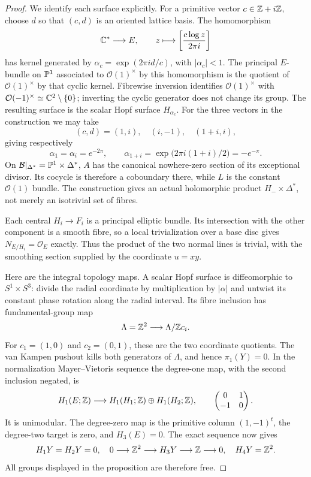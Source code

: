 \begin{proof}
We identify each surface explicitly.  For a primitive vector
$c\in\mathbb Z+i\mathbb Z$, choose $d$ so that $(c,d)$ is an oriented
lattice basis.  The homomorphism
\[
 \mathbb C^*\longrightarrow E,\qquad
 z\longmapsto\left[\frac{c\log z}{2\pi i}\right]
\]
has kernel generated by
$\alpha_c=\exp(2\pi i d/c)$, with $|\alpha_c|<1$.
The principal $E$-bundle on $\mathbb P^1$ associated to
$\mathcal O(1)^\times$ by this homomorphism is the quotient
of $\mathcal O(1)^\times$ by that cyclic kernel.  Fibrewise
inversion identifies $\mathcal O(1)^\times$ with
$\mathcal O(-1)^\times\simeq\mathbb C^2\setminus\{0\}$;
inverting the cyclic generator does not change its group.
The resulting surface is the scalar Hopf surface $H_{\alpha_c}$.
For the three vectors in the construction we may take
\[
 (c,d)=(1,i),\quad(i,-1),\quad(1+i,i),
\]
giving respectively
\[
 \alpha_1=\alpha_i=e^{-2\pi},\qquad
 \alpha_{1+i}=\exp\bigl(2\pi i(1+i)/2\bigr)=-e^{-\pi}.
\]
On $\mathcal B|_{\Delta^*}=\mathbb P^1\times\Delta^*$,
$A$ has the canonical nowhere-zero section of its exceptional
divisor.  Its cocycle is therefore a coboundary there, while
$L$ is the constant $\mathcal O(1)$ bundle.  The construction
gives an actual holomorphic product $H_-\times\Delta^*$,
not merely an isotrivial set of fibres.

Each central $H_i\to F_i$ is a principal elliptic bundle.
Its intersection with the other component is a smooth fibre,
so a local trivialization over a base disc gives
$N_{E/H_i}=\mathcal O_E$ exactly.  Thus the product of the
two normal lines is trivial, with the smoothing section supplied
by the coordinate $u=xy$.

Here are the integral topology maps.  A scalar Hopf surface is
diffeomorphic to $S^1\times S^3$: divide the radial coordinate
by multiplication by $|\alpha|$ and untwist its constant phase
rotation along the radial interval.  Its fibre inclusion has
fundamental-group map
\[
 \Lambda=\mathbb Z^2\longrightarrow\Lambda/\mathbb Z c_i.
\]
For $c_1=(1,0)$ and $c_2=(0,1)$, these are the two coordinate
quotients.  The van Kampen pushout kills both generators of
$\Lambda$, and hence $\pi_1(Y)=0$.  In the normalization
Mayer--Vietoris sequence the degree-one map, with the second
inclusion negated, is
\[
 H_1(E;\mathbb Z)\longrightarrow H_1(H_1;\mathbb Z)\oplus H_1(H_2;\mathbb Z),
 \qquad \begin{pmatrix}0&1\\-1&0\end{pmatrix}.
\]
It is unimodular.  The degree-zero map is the primitive column
$(1,-1)^t$, the degree-two target is zero, and $H_3(E)=0$.
The exact sequence now gives
\[
 H_1Y=H_2Y=0,\quad
 0\longrightarrow\mathbb Z^2\longrightarrow H_3Y
       \longrightarrow\mathbb Z\longrightarrow0,
 \quad H_4Y=\mathbb Z^2.
\]
All groups displayed in the proposition are therefore free.


\end{proof}
